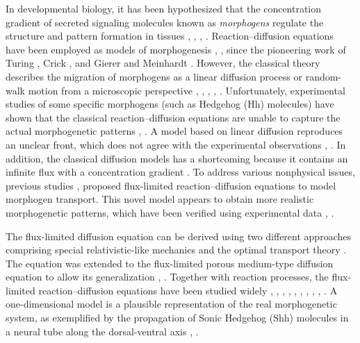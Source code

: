 \documentclass[jkps,preprint,fleqn,showpacs,showkeys]{revtex4}
\begin{document}
In developmental biology, it has been hypothesized that the concentration gradient of secreted signaling molecules known as \emph{morphogens} regulate the structure and pattern formation in tissues \cite{Dessaud2007interpretation}, \cite{Rogers2011}, \cite{Briscoe2013mechanisms}, \cite{Simon2016}. Reaction--diffusion equations have been employed as models of morphogenesis \cite{Lander2002}, \cite{Saha2006signal}, \cite{Kondo2010} since the pioneering work of Turing \cite{Turing1952chemical}, Crick \cite{Crick1970diffusion}, and Gierer and Meinhardt \cite{Gierer1972}. However, the classical theory describes the migration of morphogens as a linear diffusion process or random-walk motion from a microscopic perspective \cite{Turing1952chemical}, \cite{Crick1970diffusion}, \cite{Gierer1972}, \cite{Lander2002}, \cite{Kondo2010}. Unfortunately, experimental studies of some specific morphogens (such as Hedgehog (Hh) molecules) have shown that the classical reaction--diffusion equations are unable to capture the actual morphogenetic patterns \cite{Verbeni2013morphogenetic}, \cite{Sanchez2015modeling}. A model based on linear diffusion \cite{Saha2006signal} reproduces an unclear front, which does not agree with the experimental observations \cite{Verbeni2013morphogenetic}, \cite{Sanchez2015modeling}. In addition, the classical diffusion models has a shortcoming because it contains an infinite flux with a concentration gradient \cite{Rosenau1992Tempered}. To address various nonphysical issues, previous studies \cite{Verbeni2013morphogenetic}, \cite{Sanchez2015modeling} proposed flux-limited reaction--diffusion equations to model morphogen transport. This novel model appears to obtain more realistic morphogenetic patterns, which have been verified using experimental data \cite{Verbeni2013morphogenetic}, \cite{Sanchez2015modeling}.

The flux-limited diffusion equation can be derived using two different approaches comprising special relativistic-like mechanics \cite{Rosenau1992Tempered} and the optimal transport theory \cite{Brenier2003}. The equation was extended to the flux-limited porous medium-type diffusion equation to allow its generalization \cite{Chertock2003}, \cite{Caselles2013flux}. Together with reaction processes, the flux-limited reaction--diffusion equations have been studied widely \cite{Kurganov2006onreaction}, \cite{Andreu2010AFisher}, \cite{Andreu2012}, \cite{Garrione2015}, \cite{Campos2013ontheanalysis}, \cite{Campos2016}, \cite{Calvo2015flux}, \cite{Calvo2016pattern}, \cite{Calvo2017singular}, \cite{Calvo2018}. A one-dimensional model is a plausible representation of the real morphogenetic system, as exemplified by the propagation of Sonic Hedgehog (Shh) molecules in a neural tube along the dorsal-ventral axis \cite{Verbeni2013morphogenetic}, \cite{Sanchez2015modeling}. 
\end{document}

